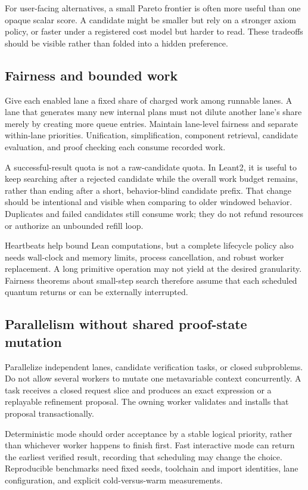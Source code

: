 \documentclass[11pt,letterpaper]{article}
\theoremstyle{definition}
\theoremstyle{remark}
\begin{document}
For user-facing alternatives, a small Pareto frontier is often more useful than one opaque scalar score. A candidate might be smaller but rely on a stronger axiom policy, or faster under a registered cost model but harder to read. These tradeoffs should be visible rather than folded into a hidden preference.

\subsection{Fairness and bounded work}

Give each enabled lane a fixed share of charged work among runnable lanes. A lane that generates many new internal plans must not dilute another lane's share merely by creating more queue entries. Maintain lane-level fairness and separate within-lane priorities. Unification, simplification, component retrieval, candidate evaluation, and proof checking each consume recorded work.

A successful-result quota is not a raw-candidate quota. In Leant2, it is useful to keep searching after a rejected candidate while the overall work budget remains, rather than ending after a short, behavior-blind candidate prefix. That change should be intentional and visible when comparing to older windowed behavior. Duplicates and failed candidates still consume work; they do not refund resources or authorize an unbounded refill loop.

Heartbeats help bound Lean computations, but a complete lifecycle policy also needs wall-clock and memory limits, process cancellation, and robust worker replacement. A long primitive operation may not yield at the desired granularity. Fairness theorems about small-step search therefore assume that each scheduled quantum returns or can be externally interrupted.

\subsection{Parallelism without shared proof-state mutation}

Parallelize independent lanes, candidate verification tasks, or closed subproblems. Do not allow several workers to mutate one metavariable context concurrently. A task receives a closed request slice and produces an exact expression or a replayable refinement proposal. The owning worker validates and installs that proposal transactionally.

Deterministic mode should order acceptance by a stable logical priority, rather than whichever worker happens to finish first. Fast interactive mode can return the earliest verified result, recording that scheduling may change the choice. Reproducible benchmarks need fixed seeds, toolchain and import identities, lane configuration, and explicit cold-versus-warm measurements.
\end{document}
